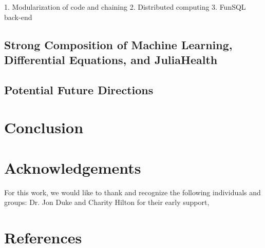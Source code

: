 \documentclass{juliacon}
\begin{document}
    1. Modularization of code and chaining
    2. Distributed computing
    3. FunSQL back-end

\subsection{Strong Composition of Machine Learning, Differential Equations, and JuliaHealth}

\subsection{Potential Future Directions}

\section{Conclusion}

\section{Acknowledgements}

For this work, we would like to thank and recognize the following individuals and groups: Dr. Jon Duke and Charity Hilton for their early support, 

\section{References}


\end{document}
